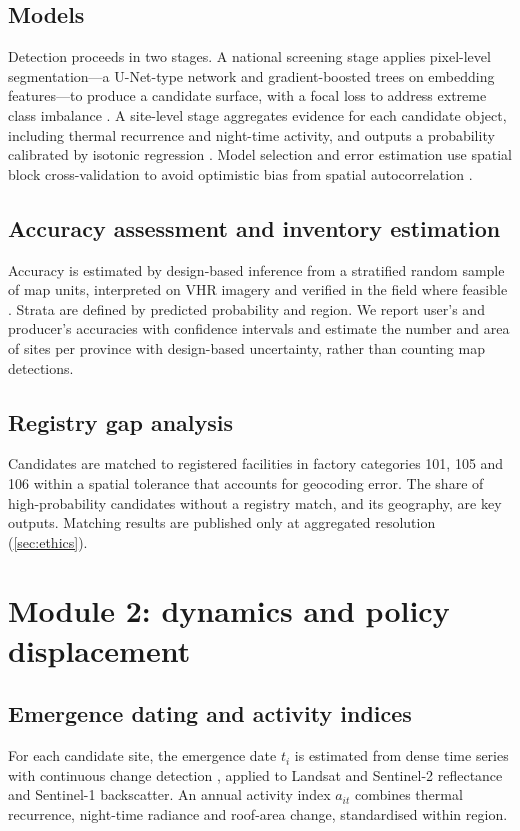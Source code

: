 \documentclass[10pt]{article}
\begin{document}
\subsection{Models}
Detection proceeds in two stages. A national screening stage applies pixel-level segmentation---a U-Net-type network \citep{ronneberger2015} and gradient-boosted trees on embedding features---to produce a candidate surface, with a focal loss to address extreme class imbalance \citep{lin2017}. A site-level stage aggregates evidence for each candidate object, including thermal recurrence and night-time activity, and outputs a probability calibrated by isotonic regression \citep{niculescu2005}. Model selection and error estimation use spatial block cross-validation to avoid optimistic bias from spatial autocorrelation \citep{roberts2017}.

\subsection{Accuracy assessment and inventory estimation}
Accuracy is estimated by design-based inference from a stratified random sample of map units, interpreted on VHR imagery and verified in the field where feasible \citep{olofsson2014}. Strata are defined by predicted probability and region. We report user's and producer's accuracies with confidence intervals and estimate the number and area of sites per province with design-based uncertainty, rather than counting map detections.

\subsection{Registry gap analysis}
Candidates are matched to registered facilities in factory categories 101, 105 and 106 within a spatial tolerance that accounts for geocoding error. The share of high-probability candidates without a registry match, and its geography, are key outputs. Matching results are published only at aggregated resolution (\cref{sec:ethics}).

\section{Module 2: dynamics and policy displacement}\label{sec:m2}
\subsection{Emergence dating and activity indices}
For each candidate site, the emergence date $t_i$ is estimated from dense time series with continuous change detection \citep{zhu2014}, applied to Landsat and Sentinel-2 reflectance and Sentinel-1 backscatter. An annual activity index $a_{it}$ combines thermal recurrence, night-time radiance and roof-area change, standardised within region.
\end{document}

